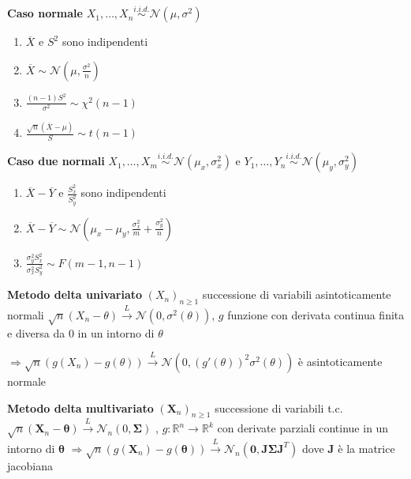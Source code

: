 \documentclass[openany]{book} %
\begin{document}
\textbf{Caso normale} $X_1,\dots,X_n \overset{i.i.d.}{\sim}\mathcal{N}(\mu,\sigma^2)$

\begin{enumerate}

\item $\overline {X}$ e $S^2$ sono indipendenti

\item $\overline{X}\sim \mathcal{N}(\mu,\frac{\sigma^2}{n})$

\item $\frac{(n-1)S^2}{\sigma^2}\sim\chi^2(n-1)$

\item $\frac{\sqrt{n}(\overline{X}-\mu)}{S}\sim t(n-1)$

\end{enumerate}

\textbf{Caso due normali} $X_1,\dots,X_m \overset{i.i.d.}{\sim}\mathcal{N}(\mu_x,\sigma_x^2)$ e $Y_1,\dots,Y_n \overset{i.i.d.}{\sim}\mathcal{N}(\mu_y,\sigma^2_y)$

\begin{enumerate}

\item $\overline{X}-\overline{Y}$ e $\frac{S_x^2}{S_y^2}$ sono indipendenti

\item $\overline{X}-\overline{Y}\sim \mathcal{N}(\mu_x-\mu_y,\frac{\sigma_x^2}{m}+\frac{\sigma_y^2}{n})$ 

\item $\frac{\sigma_y^2S_x^2}{\sigma_x^2S_y^2}\sim F(m-1,n-1)$

\end{enumerate}

\textbf{Metodo delta univariato} $(X_n)_{n\geq 1}$ successione di variabili asintoticamente normali $\sqrt{n}(X_n-\theta)\overset{L}{\rightarrow}\mathcal{N}(0,\sigma^2(\theta))$, $g$ funzione con derivata continua finita e diversa da 0 in un intorno di $\theta$ 

$\Rightarrow \sqrt {n}(g(X_n)-g(\theta))\overset{L}{\rightarrow}\mathcal{N}(0,(g'(\theta))^2\sigma^2(\theta))$ è asintoticamente normale

\textbf{Metodo delta multivariato} $(\boldsymbol{X}_n)_{n\geq 1}$ successione di variabili t.c. $\sqrt{n}(\boldsymbol{X}_n-\boldsymbol{\theta})\overset{L}{\rightarrow}\mathcal{N}_n(0,\boldsymbol{\Sigma})$ , $g:\mathbb{R}^n \rightarrow \mathbb{R}^k$ con derivate parziali continue in un intorno di $\boldsymbol{\theta}$ $\Rightarrow \sqrt {n}(g(\boldsymbol{X}_n)-g(\boldsymbol{\theta}))\overset{L}{\rightarrow}\mathcal{N}_n(\boldsymbol{0},\boldsymbol{J\Sigma J}^T)$ dove $\boldsymbol{J}$ è la matrice jacobiana
\end{document}
